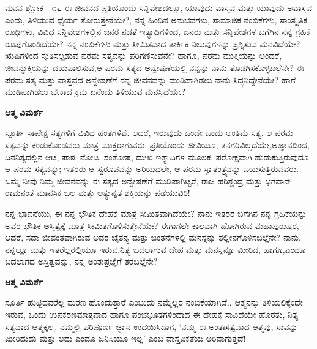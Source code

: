 \newpage
\begin{mananam}{\mananamfont ಮನನ ಶ್ಲೋಕ - ೧೬}
\small \mananatext ಈ ಜೀವನದ ಪ್ರತಿಯೊಂದು ಸನ್ನಿವೇಶದಲ್ಲೂ, ಯಾವುದು ವಾಸ್ತವ ಮತ್ತು ಯಾವುದು ಅವಾಸ್ತವ ಎಂದು, ತಿಳಿಯುವ ಧೈರ್ಯ ತೋರುತ್ತೇನೆಯೇ?, ನನ್ನ ಹಿಂದಿನ ಅನುಭವಗಳು, ಸಾಮಾಜಿಕ ನಂಬಿಕೆಗಳು, ಸಾಂಸ್ಕೃತಿಕ ರೂಢಿಗಳು, ವಿವಿಧ ಸನ್ನಿವೇಶಗಳಲ್ಲಿನ ಜನರ ನಡತೆ ಇತ್ಯಾದಿಗಳಿಂದ, ಜನರು ಮತ್ತು ಸನ್ನಿವೇಶಗಳ ಬಗೆಗಿನ ನನ್ನ ಗ್ರಹಿಕೆ ರೂಪುಗೊಂಡಿದೆಯೇ? ನನ್ನ ನಂಬಿಕೆಗಳು ಮತ್ತು ಸೀಮಿತವಾದ ತಾರ್ಕಿಕ ನಿಲುವುಗಳನ್ನು ಪ್ರಶ್ನಿಸುವ ಮನವಿದೆಯೇ? ಋಷಿಗಳಿಂದ ಸ್ತುತಿಸಲ್ಪಡುವ ಪರಮ ಸತ್ಯವನ್ನು ಪರಿಗಣಿಸುವೆನೇ? ಹಾಗೂ, ಪರಮ ಮುಕ್ತಿಯನ್ನು ಅಂದರೆ, ಜೀವನ್ಮುಕ್ತಿಯನ್ನು ದಯಪಾಲಿಸುವ,ಆ ಪರಮ ಸತ್ಯದ ಅನ್ವೇಷಣೆಯಲ್ಲಿ ನನ್ನನ್ನು ನಾನು ತೊಡಗಿಸಕೊಳ್ಳಬಲ್ಲೆನೇ? ಈ ಪರಮ ಸತ್ಯ ಮತ್ತು ವಾಸ್ತವದ ಅನ್ವೇಷಣೆಗೆ ನನ್ನ ಜೀವನವನ್ನು ಮುಡಿಪಾಗಿಡಲು ನಾನು ಸಿದ್ಧನಿದ್ದೇನೆಯೇ? ಹಾಗೆ ಮುಡಿಪಾಗಿಡಲು ಬೇಕಾದ ಕ್ರಮ ಏನೆಂದು ತಿಳಿಯುವ ಮನಸ್ಸಿದೆಯೇ?
\end{mananam}
\WritingHand\enspace\textbf{ಆತ್ಮ ವಿಮರ್ಶೆ}
\begin{inspiration}{\mananamfont ಸ್ಪೂರ್ತಿ}
\small \mananatext ಸಾಪೇಕ್ಷ ಸತ್ಯಗಳಿಗೆ ವಿವಿಧ ಹಂತಗಳಿವೆ. ಆದರೆ, ಇರುವುದು ಒಂದೇ ಒಂದು ಅಂತಿಮ ಸತ್ಯ. ಆ ಪರಮ ಸತ್ಯವನ್ನು ಕಂಡುಕೊಂಡವರು ಮಾತ್ರ ಮುಕ್ತರಾಗುವರು. ಪ್ರತಿಯೊಂದು ಜೀವಿಯೂ, ತನಗರಿವಿಲ್ಲದೆಯೇ,ಅಜ್ಞಾನದಿಂದ, ದಿನನಿತ್ಯದಲ್ಲಿನ ಆಟ, ಪಾಠ, ನೋಟ, ಸಂತೋಷ, ದುಃಖ ಇತ್ಯಾದಿಗಳ ಮೂಲಕ, ಪರೋಕ್ಷವಾಗಿ ಹುಡುಕುತ್ತಿರುವುದೂ ಆ ಪರಮ ಸತ್ಯವನ್ನು; ಇತರರು ಆ ಸ್ವರೂಪವನ್ನು ಅರಿಯದಲೇ, ಆ ಪರಮ ಸ್ವಾತಂತ್ರ್ಯವನ್ನು ಬಯಸುತ್ತಿರುವವರು. ಒಮ್ಮೆ ನೀವು ನಿಮ್ಮ ಜೀವನವನ್ನು ಈ ಸತ್ಯದ ಅನ್ವೇಷಣೆಗೆ ಮುಡಿಪಾಗಿಟ್ಟರೆ, ರಾಜ ಹರಿಶ್ಚಂದ್ರ ಮತ್ತು ಭಗವಾನ್ ರಾಮನಂತೆ ಮಾನಸಿಕ ಬಲ ಮತ್ತು ಅತ್ಯುನ್ನತ ಶಕ್ತಿಯನ್ನು ಪಡೆಯುವಿರಿ!
\end{inspiration}

\newpage
\begin{mananam}{}
\small \mananatext ನನ್ನ ಭಾವನೆಯು, ಈ ನನ್ನ ಭೌತಿಕ ದೇಹಕ್ಕೆ ಮಾತ್ರ ಸೀಮಿತವಾಗಿದೆಯೇ? ನಾನು ಇತರರ ಬಗೆಗಿನ ನನ್ನ ಗ್ರಹಿಕೆಯನ್ನು ಅವರ ಭೌತಿಕ ಅಸ್ತಿತ್ವಕ್ಕೆ ಮಾತ್ರ ಸೀಮಿತಗೊಳಿಸುತ್ತೇನೆಯೇ? ಈಗಾಗಲೇ ಕಾಲವಾಗಿ ಹೋಗಿರುವ ಮಹಾಪುರುಷರ, ಆದರೆ, ಸದಾ ಜೀವಂತವಾಗಿರುವ ಅವರ ಚೈತನ್ಯ ಮತ್ತು ಚಿಂತನೆಗಳಲ್ಲಿ ಮನಸ್ಸನ್ನು ತಲ್ಲೀನಗೊಳಿಸಬಲ್ಲೆನೇ? ನಾನು, ನನ್ನಲ್ಲೂ ಮತ್ತು ಇತರೆಲ್ಲರಲ್ಲಿಯೂ ಇರುವ,ನಿತ್ಯ ಬದಲಾಗುವ ದೇಹ ಮತ್ತು ಮನಸ್ಸನ್ನೂ ಮೀರಿದ, ಹಾಗೂ,ಎಂದೂ ಬದಲಾಗದ ಅಸ್ತಿತ್ವವನ್ನು, ನನ್ನ ಅಂತಃಪ್ರಜ್ಞೆಗೆ ತರಬಲ್ಲೆನೇ?
\end{mananam}
\WritingHand\enspace\textbf{ಆತ್ಮ ವಿಮರ್ಶೆ}
\begin{inspiration}{\mananamfont ಸ್ಪೂರ್ತಿ}
\small \mananatext ಹುಟ್ಟಿದವರೆಲ್ಲ ಮರಣ ಹೊಂದುತ್ತಾರೆ ಎಂಬುದು ನಮ್ಮೆಲ್ಲರ ನಂಬಿಕೆಯಾಗಿದೆ., ಆತ್ಮನನ್ನು ತಿಳಿಯಲಿಕ್ಕೆಂದೇ ಇರುವ, ಒಂದು ಉಪಕರಣಮಾತ್ರವಾದ ಹಾಗೂ ಪಂಚಭೂತಗಳಿಂದಾದ ಈ ದೇಹಕ್ಕೆ ಸಾವಿದೆಯೇ ಹೊರತು, ನಿತ್ಯ ಸತ್ಯವಾದ ಆತ್ಮಕ್ಕಲ್ಲ. ನಮ್ಮಲ್ಲಿ ಪರಿಪೂರ್ಣ ಜ್ಞಾನ ಉದಯಿಸಿದಾಗ, ‘ನಮ್ಮ ಈ ಅಂತಃಸತ್ವವಾದ ಆತ್ಮವು, ಸಾವನ್ನು ಮೀರಿದುದು ಮತ್ತು ಅದು ಎಂದೂ ಜನಿಸಿಯೂ ಇಲ್ಲ’ ಎಂಬ ವಾಸ್ತವಿಕತೆಯ ಅರಿವಾಗುತ್ತದೆ!
\end{inspiration}
\newpage



